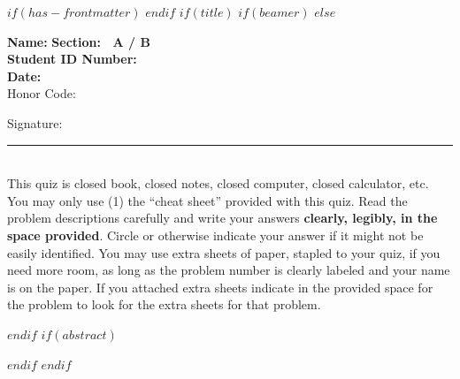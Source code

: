 $if(has-frontmatter)$
\frontmatter
$endif$
$if(title)$
$if(beamer)$
\frame{\titlepage}
$else$
\maketitle

\newcommand{\littleblank}{\rule{.5in}{.01in}~~}
\newcommand{\bigblank}{\rule{2.5in}{.01in}~~}
\renewcommand{\setminus}{\backslash}


\raggedbottom

\vspace{-.6in}

\textbf{Name:} \underline{\hspace*{3in}} 
\hfill
\textbf{Section:~ A / B} ~ ~ ~ \\[2mm]

\textbf{Student ID Number:} \underline{\hspace*{3in}} \\[2mm]

\textbf{Date:} \underline{\hspace*{1.5in}} \\ 

{\Large{Honor Code:}}
\vspace{.6in}

Signature: \bigblank\\


This quiz is closed book, closed notes, closed computer, closed calculator,
etc. 
You may only use (1) the ``cheat sheet'' provided with this quiz. 
Read the problem descriptions carefully and write your answers \textbf{clearly, legibly, in the space provided}. 
Circle or otherwise indicate your answer if it might not be easily identified. 
You may use extra sheets of paper, stapled to your quiz, if you need more room, as long as the problem number is clearly labeled and your name is on the paper. 
If you attached extra sheets indicate in the provided space for the problem to look for the extra sheets for that problem.

\pagebreak

$endif$
$if(abstract)$
\begin{abstract}
$abstract$
\end{abstract}
$endif$
$endif$

